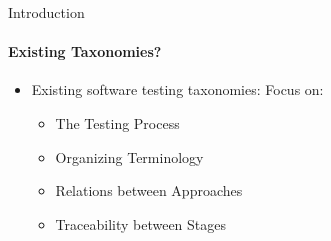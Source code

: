 \documentclass{beamer}
\begin{document}
\begin{frame}{Introduction}
    \framesubtitle{Existing Taxonomies?}
    \begin{itemize}
        \item Existing software testing taxonomies: \hfill Focus on: \hspace{0.25cm}
              \begin{itemize}
                  \item \citet{TebesEtAl2020a} \hfill {\small The Testing Process}
                  \item \citet{SouzaEtAl2017} \hfill {\small Organizing Terminology}
                  \item \citet{Firesmith2015} \hfill {\small Relations between Approaches}
                  \item \citet{UnterkalmsteinerEtAl2014} \hfill {\small Traceability between Stages}
              \end{itemize}
    \end{itemize}
\end{frame}


\end{document}
